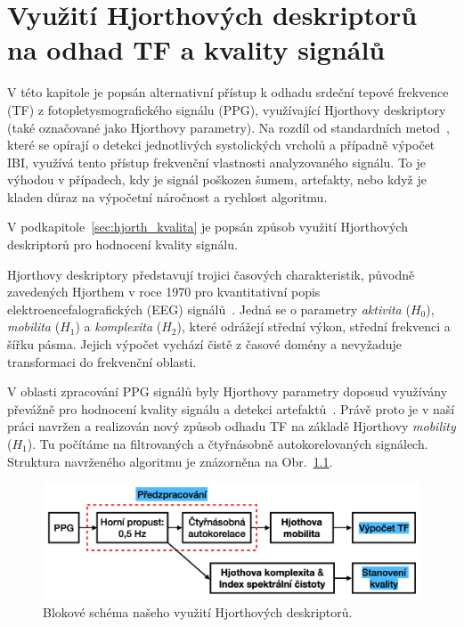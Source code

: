 \chapter{Využití Hjorthových deskriptorů na odhad TF a kvality signálů}
\label{ch:hjorth}
V této kapitole je popsán alternativní přístup k odhadu srdeční tepové frekvence (\acs{TF}) z fotopletysmografického signálu (\acs{PPG}), využívající Hjorthovy deskriptory (také označované jako Hjorthovy parametry).
Na rozdíl od standardních metod~\cite{ENIKÖ,Charlton2022,NeuroKit2}, které se opírají o detekci jednotlivých systolických vrcholů a případně výpočet \acs{IBI}, využívá tento přístup frekvenční vlastnosti analyzovaného signálu.
To je výhodou v případech, kdy je signál poškozen šumem, artefakty, nebo když je kladen důraz na výpočetní náročnost a rychlost algoritmu.

V podkapitole~\ref{sec:hjorth_kvalita} je popsán způsob využití Hjorthových deskriptorů pro hodnocení kvality signálu. %

Hjorthovy deskriptory představují trojici časových charakteristik, původně zavedených Hjorthem v roce 1970 pro kvantitativní popis elektroencefalografických (\acs{EEG}) signálů~\cite{Hjorth1973}.
Jedná se o parametry \textit{aktivita} (\(H_0\)), \textit{mobilita} (\(H_1\)) a \textit{komplexita} (\(H_2\)), které odrážejí střední výkon, střední frekvenci a šířku pásma.
Jejich výpočet vychází čistě z časové domény a nevyžaduje transformaci do frekvenční oblasti.

V oblasti zpracování \acs{PPG} signálů byly Hjorthovy parametry doposud využívány převážně pro hodnocení kvality signálu a detekci artefaktů~\cite{Peralta2017}. %
Právě proto je v naší práci navržen a realizován nový způsob odhadu \acs{TF} na základě Hjorthovy \textit{mobility} (\(H_1\)).
Tu počítáme na filtrovaných a čtyřnásobně autokorelovaných signálech.
Struktura navrženého algoritmu je znázorněna na Obr.~\ref{fig:hjorth_schemata}.

\begin{figure}[h]
	\centering
	\includegraphics[width=1\textwidth]{./obrazky/hjorth_schema.png} %
	\caption[Schéma našeho algorimu, který využívá Hjorthových deskriptorů]{Blokové schéma našeho využití Hjorthových deskriptorů.}
	\label{fig:hjorth_schemata}
\end{figure}

